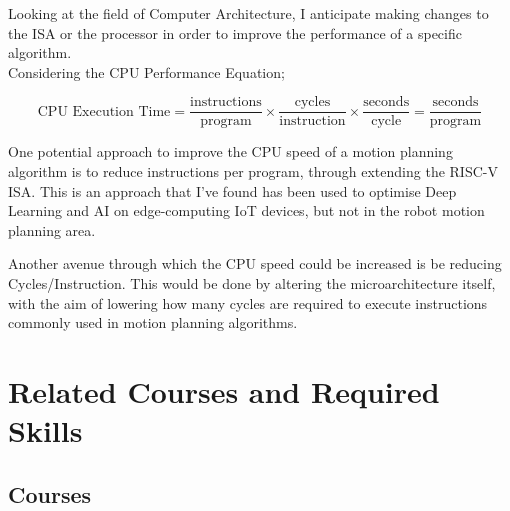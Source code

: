 \documentclass[11pt, oneside]{article}   	%
\begin{document}
Looking at the field of Computer Architecture, I anticipate making changes to the ISA or the processor in order to improve the performance of a specific algorithm. \\

Considering the CPU Performance Equation;

\[
\text{CPU Execution Time} = \frac{\text{instructions}}{\text{program}} \times \frac{\text{cycles}}{\text{instruction}} \times \frac{\text{seconds}}{\text{cycle}} = \frac{\text{seconds}}{\text{program}}
\]

One potential approach to improve the CPU speed of a motion planning algorithm is to reduce instructions per program, through extending the RISC-V ISA. This is an approach that I’ve found has been used to optimise Deep Learning and AI on edge-computing IoT devices, but not in the robot motion planning area.

Another avenue through which the CPU speed could be increased is be reducing Cycles/Instruction. This would be done by altering the microarchitecture itself, with the aim of lowering how many cycles are required to execute instructions commonly used in motion planning algorithms. 

\clearpage

\section{Related Courses and Required Skills}

\subsection{Courses}
\end{document}
